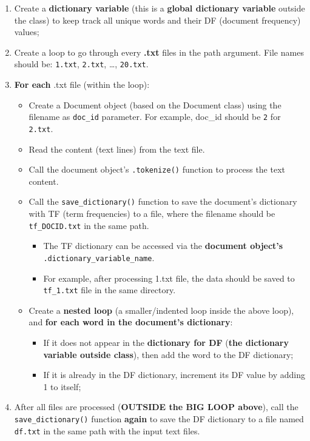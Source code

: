 \documentclass[
  letterpaper,
]{scrbook}
\providecommand{\tightlist}{%
  \setlength{\itemsep}{0pt}\setlength{\parskip}{0pt}}
\begin{document}
\begin{enumerate}
\def\labelenumi{\arabic{enumi}.}
\item
  Create a \textbf{dictionary variable} (this is a \textbf{global
  dictionary variable} outside the class) to keep track all unique words
  and their DF (document frequency) values;
\item
  Create a loop to go through every \textbf{.txt} files in the path
  argument. File names should be: \texttt{1.txt}, \texttt{2.txt},
  \ldots, \texttt{20.txt}.
\item
  \textbf{For each} .txt file (within the loop):

  \begin{itemize}
  \item
    Create a Document object (based on the Document class) using the
    filename as \texttt{doc\_id} parameter. For example, doc\_id should
    be \texttt{2} for \texttt{2.txt}.
  \item
    Read the content (text lines) from the text file.
  \item
    Call the document object's \texttt{.tokenize()} function to process
    the text content.
  \item
    Call the \texttt{save\_dictionary()} function to save the document's
    dictionary with TF (term frequencies) to a file, where the filename
    should be \texttt{tf\_DOCID.txt} in the same path.

    \begin{itemize}
    \item
      The TF dictionary can be accessed via the \textbf{document
      object's} \texttt{.dictionary\_variable\_name}.
    \item
      For example, after processing 1.txt file, the data should be saved
      to \texttt{tf\_1.txt} file in the same directory.
    \end{itemize}
  \item
    Create a \textbf{nested loop} (a smaller/indented loop inside the
    above loop), and \textbf{for each word in the document's
    dictionary}:

    \begin{itemize}
    \tightlist
    \item
      If it does not appear in the \textbf{dictionary for DF}
      (\textbf{the dictionary variable outside class}), then add the
      word to the DF dictionary;
    \item
      If it is already in the DF dictionary, increment its DF value by
      adding 1 to itself;
    \end{itemize}
  \end{itemize}
\item
  After all files are processed (\textbf{OUTSIDE the BIG LOOP above}),
  call the \texttt{save\_dictionary()} function \textbf{again} to save
  the DF dictionary to a file named \texttt{df.txt} in the same path
  with the input text files.
\end{enumerate}
\end{document}
